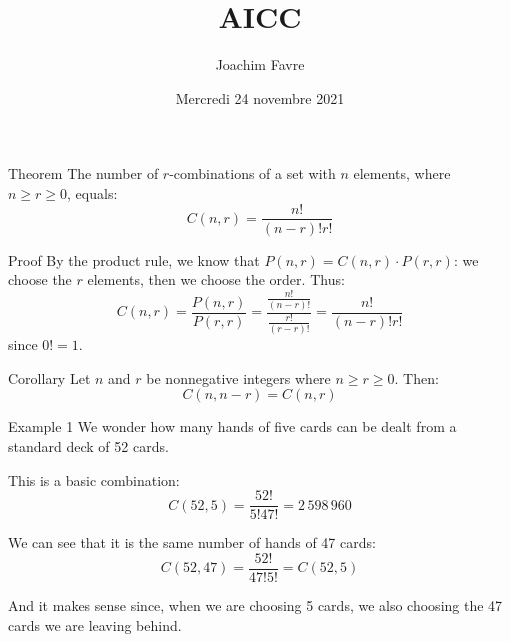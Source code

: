 \documentclass[a4paper]{article}
\title{AICC}
\author{Joachim Favre}
\date{Mercredi 24 novembre 2021}
\begin{document}
\maketitle


\begin{parag}{Theorem}
    The number of $r$-combinations of a set with $n$ elements, where $n \geq r \geq 0$, equals: 
    \[C\left(n,r\right) = \frac{n!}{\left(n - r\right)!r!}\]

    \begin{subparag}{Proof}
        By the product rule, we know that $P\left(n, r\right) = C\left(n, r\right) \cdot P\left(r, r\right)$: we choose the $r$ elements, then we choose the order. Thus: 
        \[C\left(n,r\right) = \frac{P\left(n, r\right)}{P\left(r, r\right)} = \frac{\frac{n!}{\left(n - r\right)!}}{\frac{r!}{\left(r - r\right)!}} = \frac{n!}{\left(n-r\right)! r!}\]
        since $0! = 1$.
    \end{subparag}
\end{parag}

\begin{parag}{Corollary}
    Let $n$ and $r$ be nonnegative integers where $n \geq r \geq 0$. Then: 
    \[C\left(n, n - r\right) = C\left(n, r\right)\]
\end{parag}


\begin{parag}{Example 1}
    We wonder how many hands of five cards can be dealt from a standard deck of 52 cards.

    This is a basic combination: 
    \[C\left(52, 5\right) = \frac{52!}{5!47!} = 2\,598\,960\]

    We can see that it is the same number of hands of 47 cards: 
    \[C\left(52, 47\right) = \frac{52!}{47!5!} = C\left(52, 5\right)\]

    And it makes sense since, when we are choosing 5 cards, we also choosing the 47 cards we are leaving behind.
\end{parag}
\end{document}
